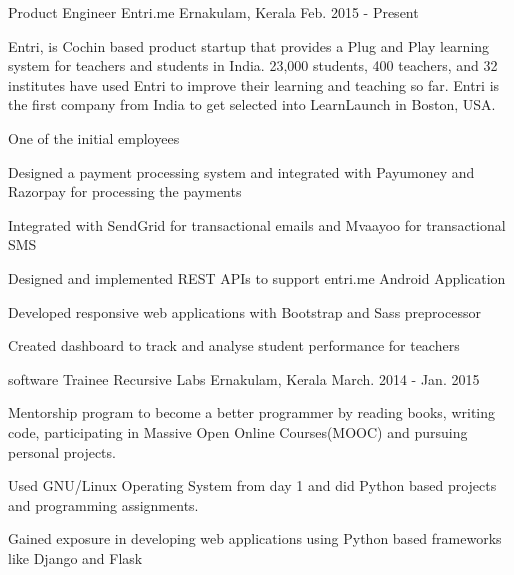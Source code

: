 

\begin{cvexperiences}

  \cvexperience
    {Product Engineer} %
    {Entri.me} %
    {Ernakulam, Kerala} %
    {Feb. 2015 - Present} %
    {\begin{cvparagraph} %
      Entri, is Cochin based product startup that provides a Plug and Play learning system for teachers and students in India. 23,000 students, 400 teachers, and 32 institutes have used Entri to improve their learning and teaching so far. Entri is the first company from India to get selected into LearnLaunch in Boston, USA.
\end{cvparagraph}
}    {
      \begin{cvitems} %
        \item {One of the initial employees}
        \item {Designed a payment processing system and integrated with Payumoney and Razorpay for processing the payments}
        \item{Integrated with SendGrid for transactional emails and Mvaayoo for transactional SMS}
        \item{Designed and implemented REST APIs to support entri.me Android Application}
        \item{Developed responsive web applications with Bootstrap and Sass preprocessor}
        \item{Created dashboard to track and analyse student performance for teachers}
      \end{cvitems}
    }

  \cvexperience
    {software Trainee} %
    {Recursive Labs} %
    {Ernakulam, Kerala} %
    {March. 2014 - Jan. 2015} %
    {\begin{cvparagraph} %
      Mentorship program to become a better programmer by reading books, writing code, participating in Massive Open Online Courses(MOOC) and pursuing personal projects.
\end{cvparagraph}
}
    {
      \begin{cvitems} %
        \item {Used GNU/Linux Operating System from day 1 and did Python based projects and programming assignments.}
        \item {Gained exposure in developing web applications using Python based frameworks like Django and Flask}
      \end{cvitems}
    }

\end{cvexperiences}
